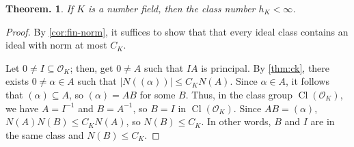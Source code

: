 \documentclass[11pt, a4paper]{memoir}
\theoremstyle{change}
\newtheorem{theorem}{Theorem.}[section]
\theoremstyle{plain}
\theoremstyle{nonumberplain}
\newtheorem{proof}{Proof}
\DeclareMathOperator{\Cl}{Cl}
\numberwithin{equation}{section}
\begin{document}
\begin{theorem}\label{thm:cl-bound}
    If $K$ is a number field, then the class number $h_K<\infty$.
\end{theorem}
\begin{proof}
    By \cref{cor:fin-norm}, it suffices to show that that every ideal class contains an ideal with norm at most $C_K$.

    Let $0\neq I\subseteq\mathcal{O}_K$; then, get $0\neq A$ such that $IA$ is principal.
    By \cref{thm:ck}, there exists $0\neq\alpha\in A$ such that $|N((\alpha))|\leq C_KN(A)$.
    Since $\alpha\in A$, it follows that $(\alpha)\subseteq A$, so $(\alpha)=AB$ for some $B$.
    Thus, in the class group $\Cl(\mathcal{O}_K)$, we have $A=I^{-1}$ and $B=A^{-1}$, so $B=I$ in $\Cl(\mathcal{O}_K)$.
    Since $AB=(\alpha)$, $N(A)N(B)\leq C_KN(A)$, so $N(B)\leq C_K$.
    In other words, $B$ and $I$ are in the same class and $N(B)\leq C_K$.
\end{proof}
\end{document}

